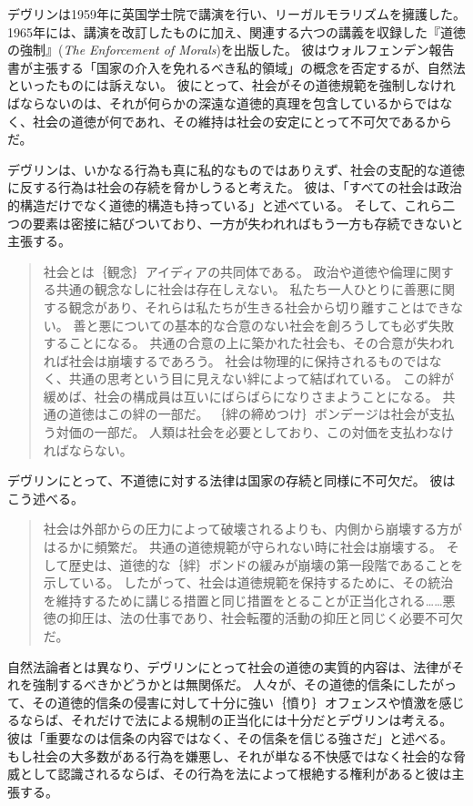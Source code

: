 \documentclass[paper=a4,book,openany]{jlreq}
\newcommand{\ig}[1]{}           %
\begin{document}
デヴリン\ig{Patrick Devlin}は1959年に英国学士院で講演を行い、リーガルモラリズムを擁護した。
1965年には、講演を改訂したものに加え、関連する六つの講義を収録した『道徳の強制』(\emph{The Enforcement of Morals})を出版した。
彼はウォルフェンデン報告書が主張する「国家の介入を免れるべき私的領域」の概念を否定するが、自然法といったものには訴えない。
彼にとって、社会がその道徳規範を強制しなければならないのは、それが何らかの深遠な道徳的真理を包含しているからではなく、社会の道徳が何であれ、その維持は社会の安定にとって不可欠であるからだ。

デヴリン\ig{Patrick Devlin}は、いかなる行為も真に私的なものではありえず、社会の支配的な道徳に反する行為は社会の存続を脅かしうると考えた。
彼は、「すべての社会は政治的構造だけでなく道徳的構造も持っている」と述べている\citep[p.9]{devlin65:_enfor_moral}。
そして、これら二つの要素は密接に結びついており、一方が失われればもう一方も存続できないと主張する。

\begin{quote}
社会とは｛観念｝{アイディア}の共同体である。
政治や道徳や倫理に関する共通の観念なしに社会は存在しえない。
私たち一人ひとりに善悪に関する観念があり、それらは私たちが生きる社会から切り離すことはできない。
善と悪についての基本的な合意のない社会を創ろうしても必ず失敗することになる。
共通の合意の上に築かれた社会も、その合意が失われれば社会は崩壊するであろう。
社会は物理的に保持されるものではなく、共通の思考という目に見えない絆によって結ばれている。
この絆が緩めば、社会の構成員は互いにばらばらになりさまようことになる。
共通の道徳はこの絆の一部だ。
｛絆の締めつけ｝{ボンデージ}は社会が支払う対価の一部だ。
人類は社会を必要としており、この対価を支払わなければならない。
\citep[p.10]{devlin65:_enfor_moral}
\end{quote}

デヴリン\ig{Patrick Devlin}にとって、不道徳に対する法律は国家の存続と同様に不可欠だ。
彼はこう述べる。

\begin{quote}
社会は外部からの圧力によって破壊されるよりも、内側から崩壊する方がはるかに頻繁だ。
共通の道徳規範が守られない時に社会は崩壊する。
そして歴史は、道徳的な｛絆｝{ボンド}の緩みが崩壊の第一段階であることを示している。
したがって、社会は道徳規範を保持するために、その統治を維持するために講じる措置と同じ措置をとることが正当化される……悪徳の抑圧は、法の仕事であり、社会転覆的活動の抑圧と同じく必要不可欠だ。
\citep[p.36]{devlin65:_enfor_moral}
\end{quote}

自然法論者とは異なり、デヴリン\ig{Patrick Devlin}にとって社会の道徳の実質的内容は、法律がそれを強制するべきかどうかとは無関係だ。
人々が、その道徳的信条にしたがって、その道徳的信条の侵害に対して十分に強い｛憤り｝{オフェンス}や憤激を感じるならば、それだけで法による規制の正当化には十分だとデヴリン\ig{Patrick Devlin}は考える。
彼は「重要なのは信条の内容ではなく、その信条を信じる強さだ」と述べる。
もし社会の大多数がある行為を嫌悪し、それが単なる不快感ではなく社会的な脅威として認識されるならば、その行為を法によって根絶する権利があると彼は主張する。
\end{document}
